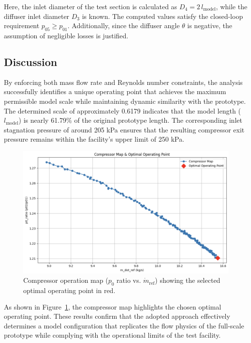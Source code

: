 \documentclass[12pt]{article}
\begin{document}
Here, the inlet diameter of the test section is calculated as \(D_4 = 2\,l_{\text{model}}\), while the diffuser inlet diameter \(D_3\) is known. The computed values satisfy the closed-loop requirement \(p_{05} \ge p_{01}\). Additionally, since the diffuser angle \(\theta\) is negative, the assumption of negligible losses is justified.

\subsection*{Discussion}
By enforcing both mass flow rate and Reynolds number constraints, the analysis successfully identifies a unique operating point that achieves the maximum permissible model scale while maintaining dynamic similarity with the prototype. The determined scale of approximately 0.6179 indicates that the model length (\(l_{\text{model}}\)) is nearly 61.79\% of the original prototype length. The corresponding inlet stagnation pressure of around 205 kPa ensures that the resulting compressor exit pressure remains within the facility’s upper limit of 250 kPa.

\begin{figure}[h]
    \centering
    \includegraphics[width=1.0\textwidth]{compressor_map.png} %
    \caption{Compressor operation map (\(p_0\) ratio vs. \(\dot{m}_{\text{ref}}\)) showing the selected optimal operating point in red.}
    \label{fig:compressor-map}
\end{figure}

As shown in Figure~\ref{fig:compressor-map}, the compressor map highlights the chosen optimal operating point. These results confirm that the adopted approach effectively determines a model configuration that replicates the flow physics of the full-scale prototype while complying with the operational limits of the test facility.
\end{document}
